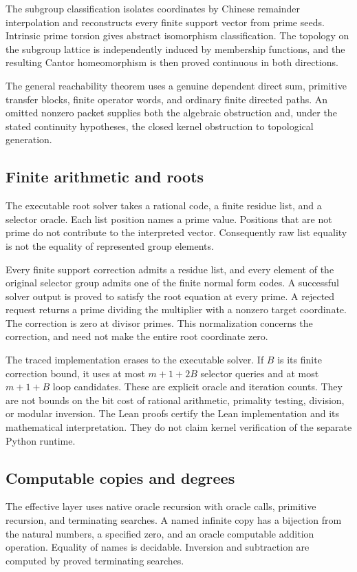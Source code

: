 The subgroup classification isolates coordinates by Chinese remainder interpolation and reconstructs every finite support vector from prime seeds. Intrinsic prime torsion gives abstract isomorphism classification. The topology on the subgroup lattice is independently induced by membership functions, and the resulting Cantor homeomorphism is then proved continuous in both directions.

The general reachability theorem uses a genuine dependent direct sum, primitive transfer blocks, finite operator words, and ordinary finite directed paths. An omitted nonzero packet supplies both the algebraic obstruction and, under the stated continuity hypotheses, the closed kernel obstruction to topological generation.

\subsection{Finite arithmetic and roots}
The executable root solver takes a rational code, a finite residue list, and a selector oracle. Each list position names a prime value. Positions that are not prime do not contribute to the interpreted vector. Consequently raw list equality is not the equality of represented group elements.

Every finite support correction admits a residue list, and every element of the original selector group admits one of the finite normal form codes. A successful solver output is proved to satisfy the root equation at every prime. A rejected request returns a prime dividing the multiplier with a nonzero target coordinate. The correction is zero at divisor primes. This normalization concerns the correction, and need not make the entire root coordinate zero.

The traced implementation erases to the executable solver. If $B$ is its finite correction bound, it uses at most $m+1+2B$ selector queries and at most $m+1+B$ loop candidates. These are explicit oracle and iteration counts. They are not bounds on the bit cost of rational arithmetic, primality testing, division, or modular inversion. The Lean proofs certify the Lean implementation and its mathematical interpretation. They do not claim kernel verification of the separate Python runtime.

\subsection{Computable copies and degrees}
The effective layer uses native oracle recursion with oracle calls, primitive recursion, and terminating searches. A named infinite copy has a bijection from the natural numbers, a specified zero, and an oracle computable addition operation. Equality of names is decidable. Inversion and subtraction are computed by proved terminating searches.

